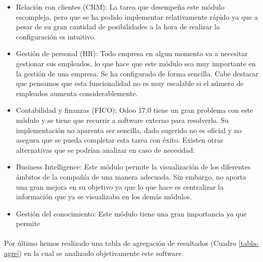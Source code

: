\begin{itemize}
    \item Relación con clientes (CRM): La tarea que desempeña este módulo escompleja, pero que se ha podido implementar relativamente rápido ya que a pesar de su gran cantidad de posibilidades a la hora de realizar la configuración es intuitivo.
    \item Gestión de personal (HR): Todo empresa en algun momento va a necesitar gestionar sus empleados, lo que hace que este módulo sea muy importante en la gestión de una empresa. Se ha configurado de forma sencilla. Cabe destacar que pensamos que esta funcionalidad no es muy escalable si el número de empleados aumenta considerablemente.
    \item Contabilidad y finanzas (FICO): Odoo 17.0 tiene un gran problema con este módulo y se tiene que recurrir a software externo para resolverlo. Su implementación no aparenta ser sencilla, dado sugerido no es oficial y no asegura que se pueda completar esta tarea con éxito. Existen otras alternativas que se podrían analizar en caso de necesidad.
    \item Business Intelligence: Este módulo permite la visualización de los diferentes ámbitos de la compañía de una manera adecuada. Sin embargo, no aporta una gran mejora en su objetivo ya que lo que hace es centralizar la información que ya se visualizaba en los demás módulos.
    \item Gestión del conocimiento: Este módulo tiene una gran importancia ya que permite 
\end{itemize}

\paragraph{}
Por último hemos realizado una tabla de agregación de resultados (Cuadro \ref{tabla-agre}) en la cual se analizado objetivamente este software.



